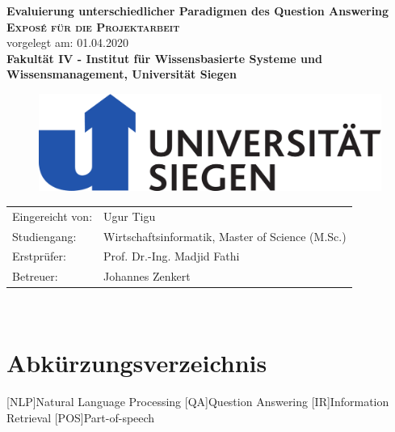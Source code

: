 \documentclass[
        ngerman,
        paper=a4,
        numbers=noendperiod,
]{scrreprt}
\begin{document}
\begin{titlepage}
    \begin{center}
    \huge \textbf{\textsf{Evaluierung unterschiedlicher Paradigmen des Question Answering}} \\
    \vspace{1cm}
    \LARGE\textbf{\textsc{Exposé für die Projektarbeit }}\\
    \vspace{1cm}
    \normalsize
    vorgelegt am: 01.04.2020\\
    \vspace{2.5cm}
    \large \textbf{Fakultät IV - 
Institut für Wissensbasierte
Systeme und Wissensmanagement, Universität Siegen
}
\linebreak
\linebreak
\begin{figure}[H]
    \centering\includegraphics[width=0.4\linewidth]{images/imageuni.pdf}
    \label{fig:Unilabel}
\end{figure}
    \end{center}
    \vspace{3cm}
    \begin{center}
 \normalsize{
    \begin{tabular}{ll}
    	Eingereicht von: & {Ugur Tigu} \\
    	Studiengang: & Wirtschaftsinformatik, Master of Science (M.Sc.)\\
	Erstprüfer: & Prof. Dr.-Ing. Madjid Fathi \\
	Betreuer: &   Johannes Zenkert\\
    \end{tabular}\\
    }
\end{center}
\end{titlepage}
\setcounter{page}{0}
\tableofcontents
\clearpage 
{}
\listoffigures
\clearpage 
{}
\listoftables
\clearpage 
\chapter*{Abkürzungsverzeichnis}
\begin{acronym}

[NLP]{Natural Language Processing}
[QA]{Question Answering}
[IR]{Information Retrieval}
[POS]{Part-of-speech}

\end{acronym}
\clearpage 
{} 
\listofxequations
\clearpage
\setcounter{page}{1}
\end{document}
